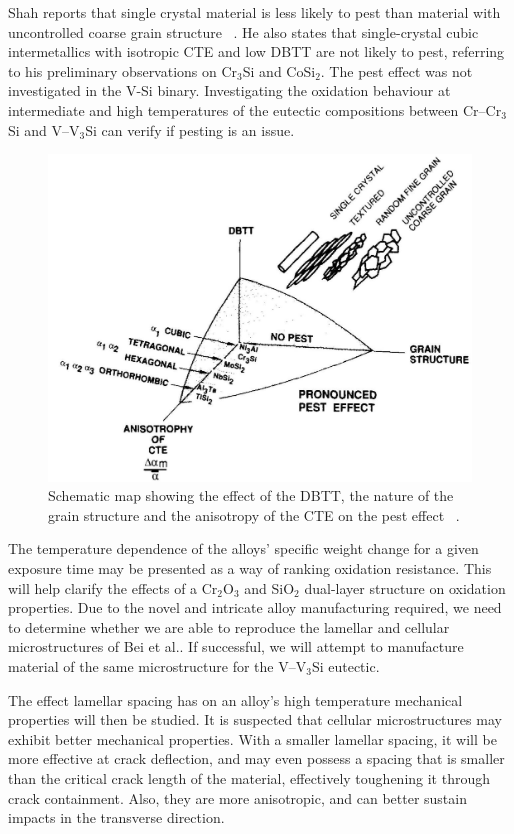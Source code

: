 Shah reports that single crystal material is less likely to pest than material with uncontrolled coarse grain structure ~\cite{shah92}. He also states that single-crystal cubic intermetallics with isotropic CTE and low DBTT are not likely to pest, referring to his preliminary observations on Cr$_3$Si and CoSi$_2$. The pest effect was not investigated in the V-Si binary. Investigating the oxidation behaviour at intermediate and high temperatures of the eutectic compositions between Cr--Cr$_3$Si and V--V$_3$Si can verify if pesting is an issue.

%

\begin{figure}[H]
\begin{center}
\includegraphics[width=.78\textwidth]{shahpest}
\caption{Schematic map showing the effect of the DBTT, the nature of the grain structure and the anisotropy of the CTE on the pest effect ~\cite{shah92}.}
\label{fig:shahpest}
\end{center}
\end{figure}
\vspace{-9mm}
%
The temperature dependence of the alloys' specific weight change for a given exposure time may be presented as a way of ranking oxidation resistance. This will help clarify the effects of a Cr$_2$O$_3$ and SiO$_2$ dual-layer structure on oxidation properties. Due to the novel and intricate alloy manufacturing required, we need to determine whether we are able to reproduce the lamellar and cellular microstructures of Bei et al.. If successful, we will attempt to manufacture material of the same microstructure for the V--V$_3$Si eutectic. 

The effect lamellar spacing has on an alloy's high temperature mechanical properties will then be studied. It is suspected that cellular microstructures may exhibit better mechanical properties. With a smaller lamellar spacing, it will be more effective at crack deflection, and may even possess a spacing that is smaller than the critical crack length of the material, effectively toughening it through crack containment. Also, they are more anisotropic, and can better sustain impacts in the transverse direction. 

